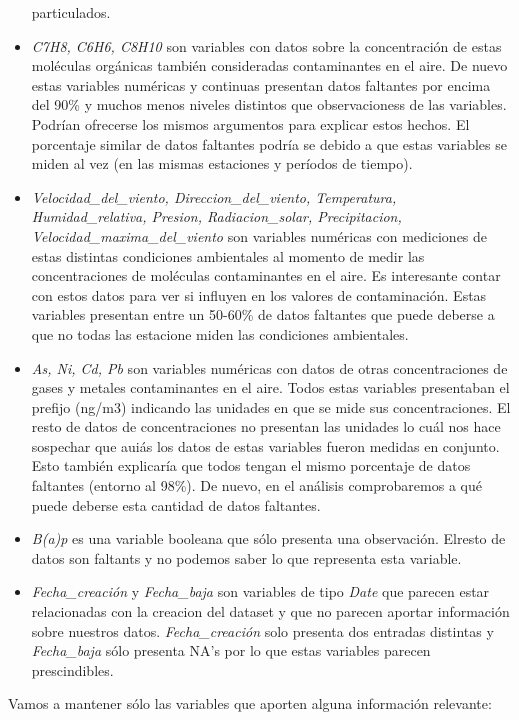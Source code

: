 \documentclass[notspecified,article,submit,moreauthors,pdftex]{Definitions/mdpi}
\begin{document}
\begin{itemize}
  particulados.
\item
  \emph{C7H8, C6H6, C8H10} son variables con datos sobre la
  concentración de estas moléculas orgánicas también consideradas
  contaminantes en el aire. De nuevo estas variables numéricas y
  continuas presentan datos faltantes por encima del 90\% y muchos menos
  niveles distintos que observacioness de las variables. Podrían
  ofrecerse los mismos argumentos para explicar estos hechos. El
  porcentaje similar de datos faltantes podría se debido a que estas
  variables se miden al vez (en las mismas estaciones y períodos de
  tiempo).
\item
  \emph{Velocidad\_del\_viento, Direccion\_del\_viento, Temperatura,
  Humidad\_relativa, Presion, Radiacion\_solar, Precipitacion,
  Velocidad\_maxima\_del\_viento} son variables numéricas con mediciones
  de estas distintas condiciones ambientales al momento de medir las
  concentraciones de moléculas contaminantes en el aire. Es interesante
  contar con estos datos para ver si influyen en los valores de
  contaminación. Estas variables presentan entre un 50-60\% de datos
  faltantes que puede deberse a que no todas las estacione miden las
  condiciones ambientales.
\item
  \emph{As, Ni, Cd, Pb} son variables numéricas con datos de otras
  concentraciones de gases y metales contaminantes en el aire. Todos
  estas variables presentaban el prefijo (ng/m3) indicando las unidades
  en que se mide sus concentraciones. El resto de datos de
  concentraciones no presentan las unidades lo cuál nos hace sospechar
  que auiás los datos de estas variables fueron medidas en conjunto.
  Esto también explicaría que todos tengan el mismo porcentaje de datos
  faltantes (entorno al 98\%). De nuevo, en el análisis comprobaremos a
  qué puede deberse esta cantidad de datos faltantes.
\item
  \emph{B(a)p} es una variable booleana que sólo presenta una
  observación. Elresto de datos son faltants y no podemos saber lo que
  representa esta variable.
\item
  \emph{Fecha\_creación} y \emph{Fecha\_baja} son variables de tipo
  \emph{Date} que parecen estar relacionadas con la creacion del dataset
  y que no parecen aportar información sobre nuestros datos.
  \emph{Fecha\_creación} solo presenta dos entradas distintas y
  \emph{Fecha\_baja} sólo presenta NA's por lo que estas variables
  parecen prescindibles.
\end{itemize}

Vamos a mantener sólo las variables que aporten alguna información
relevante:
\end{document}
